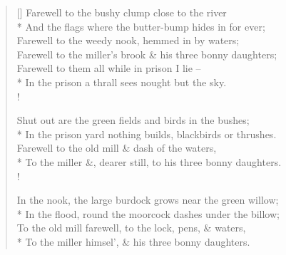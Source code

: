 \documentclass[MAIN]{subfiles}
\begin{document}
\settowidth{\versewidth}{Farewell to the bushy clump close to the river}
\begin{verse}[\versewidth]
Farewell to the bushy clump close to the river\\*
And the flags where the butter-bump hides in for ever;\\
Farewell to the weedy nook, hemmed in by waters;\\
Farewell to the miller's brook \& his three bonny daughters;\\
Farewell to them all while in prison I lie --\\*
In the prison a thrall sees nought but the sky.\\!

Shut out are the green fields and birds in the bushes;\\*
In the prison yard nothing builds, blackbirds or thrushes.\\
Farewell to the old mill \& dash of the waters,\\*
To the miller \&, dearer still, to his three bonny daughters.\\!

In the nook, the large burdock grows near the green willow;\\*
In the flood, round the moorcock dashes under the billow;\\
To the old mill farewell, to the lock, pens, \& waters,\\*
To the miller himsel', \& his three bonny daughters.
\end{verse}
\end{document}
